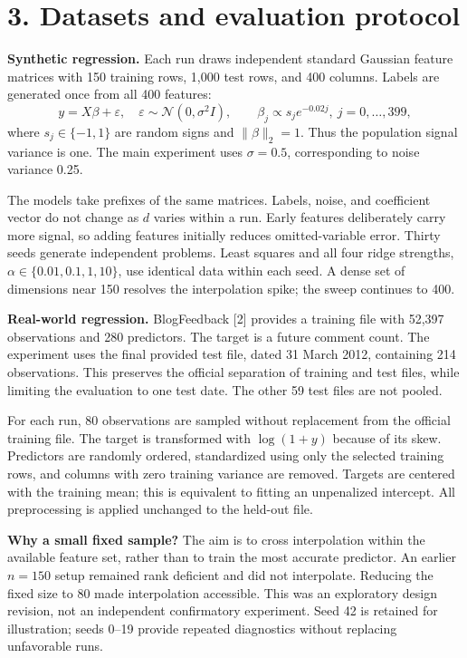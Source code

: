 \documentclass[10pt,a4paper]{article}
\newcommand{\pageheading}[1]{\section*{#1}}
\begin{document}
\newpage
\pageheading{3. Datasets and evaluation protocol}
\textbf{Synthetic regression.} Each run draws independent standard Gaussian feature matrices with 150 training rows, 1,000 test rows, and 400 columns. Labels are generated once from all 400 features:
\[
y=X\beta+\varepsilon,\quad\varepsilon\sim\mathcal N(0,\sigma^2I),
\qquad \beta_j\propto s_j e^{-0.02j},\ j=0,\ldots,399,
\]
where $s_j\in\{-1,1\}$ are random signs and $\|\beta\|_2=1$. Thus the population signal variance is one. The main experiment uses $\sigma=0.5$, corresponding to noise variance 0.25.

The models take prefixes of the same matrices. Labels, noise, and coefficient vector do not change as $d$ varies within a run. Early features deliberately carry more signal, so adding features initially reduces omitted-variable error. Thirty seeds generate independent problems. Least squares and all four ridge strengths, $\alpha\in\{0.01,0.1,1,10\}$, use identical data within each seed. A dense set of dimensions near 150 resolves the interpolation spike; the sweep continues to 400.

\textbf{Real-world regression.} BlogFeedback [2] provides a training file with 52,397 observations and 280 predictors. The target is a future comment count. The experiment uses the final provided test file, dated 31 March 2012, containing 214 observations. This preserves the official separation of training and test files, while limiting the evaluation to one test date. The other 59 test files are not pooled.

For each run, 80 observations are sampled without replacement from the official training file. The target is transformed with $\log(1+y)$ because of its skew. Predictors are randomly ordered, standardized using only the selected training rows, and columns with zero training variance are removed. Targets are centered with the training mean; this is equivalent to fitting an unpenalized intercept. All preprocessing is applied unchanged to the held-out file.

\textbf{Why a small fixed sample?} The aim is to cross interpolation within the available feature set, rather than to train the most accurate predictor. An earlier $n=150$ setup remained rank deficient and did not interpolate. Reducing the fixed size to 80 made interpolation accessible. This was an exploratory design revision, not an independent confirmatory experiment. Seed 42 is retained for illustration; seeds 0--19 provide repeated diagnostics without replacing unfavorable runs.
\end{document}
